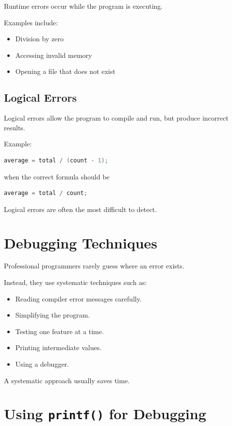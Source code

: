 \documentclass[12pt,openany]{book}
\begin{document}
Runtime errors occur while the program is executing.

Examples include:

\begin{itemize}
    \item Division by zero
    \item Accessing invalid memory
    \item Opening a file that does not exist
\end{itemize}

\subsection*{Logical Errors}

Logical errors allow the program to compile and run, but produce incorrect results.

Example:

\begin{lstlisting}[language=C]
average = total / (count - 1);
\end{lstlisting}

when the correct formula should be

\begin{lstlisting}[language=C]
average = total / count;
\end{lstlisting}

Logical errors are often the most difficult to detect.

\section{Debugging Techniques}

Professional programmers rarely guess where an error exists.

Instead, they use systematic techniques such as:

\begin{itemize}
    \item Reading compiler error messages carefully.
    \item Simplifying the program.
    \item Testing one feature at a time.
    \item Printing intermediate values.
    \item Using a debugger.
\end{itemize}

A systematic approach usually saves time.
\section{Using \texttt{printf()} for Debugging}
\end{document}

